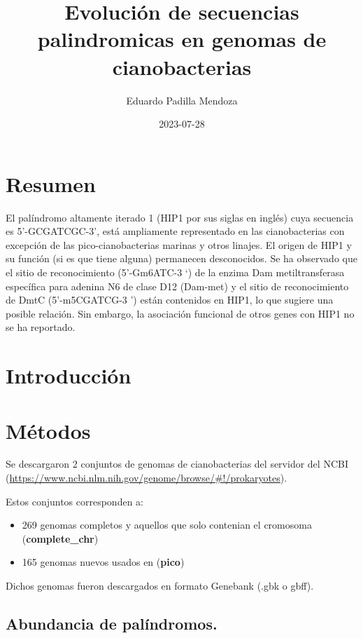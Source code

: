 \documentclass[
]{book}
\title{Evolución de secuencias palindromicas en genomas de cianobacterias}
\author{Eduardo Padilla Mendoza}
\date{2023-07-28}
\providecommand{\tightlist}{%
  \setlength{\itemsep}{0pt}\setlength{\parskip}{0pt}}
\begin{document}
\maketitle

{
\setcounter{tocdepth}{1}
\tableofcontents
}
\hypertarget{resumen}{%
\chapter*{Resumen}\label{resumen}}

El palíndromo altamente iterado 1 (HIP1 por sus siglas en inglés) cuya secuencia es 5'-GCGATCGC-3', está ampliamente representado en las cianobacterias con excepción de las pico-cianobacterias marinas y otros linajes. El origen de HIP1 y su función (si es que tiene alguna) permanecen desconocidos. Se ha observado que el sitio de reconocimiento (5'-Gm6ATC-3 `) de la enzima Dam metiltransferasa específica para adenina N6 de clase D12 (Dam-met) y el sitio de reconocimiento de DmtC (5'-m5CGATCG-3 ') están contenidos en HIP1, lo que sugiere una posible relación. Sin embargo, la asociación funcional de otros genes con HIP1 no se ha reportado.

\hypertarget{introducciuxf3n}{%
\chapter{Introducción}\label{introducciuxf3n}}

\hypertarget{muxe9todos}{%
\chapter{Métodos}\label{muxe9todos}}

Se descargaron 2 conjuntos de genomas de cianobacterias del servidor del NCBI (\url{https://www.ncbi.nlm.nih.gov/genome/browse/\#!/prokaryotes}).

Estos conjuntos corresponden a:

\begin{itemize}
\tightlist
\item
  269 genomas completos y aquellos que solo contenian el cromosoma (\textbf{complete\_chr})
\item
  165 genomas nuevos usados en \citet{cabello2022elucidating} (\textbf{pico})
\end{itemize}

Dichos genomas fueron descargados en formato Genebank (.gbk o gbff).

\hypertarget{abundancia-de-paluxedndromos.}{%
\section{Abundancia de palíndromos.}\label{abundancia-de-paluxedndromos.}}
\end{document}
